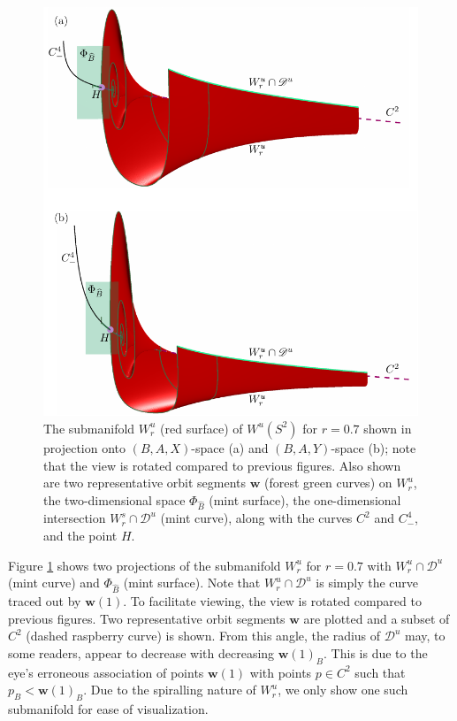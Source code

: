 \documentclass{ws-ijbc}
\begin{document}
\begin{figure}[H]
\centering
\includegraphics[]{./figures/MKMO_8.pdf}
\caption{The submanifold $W^u_{r}$ (red surface) of $W^u(S^2)$ for $r=0.7$ shown in projection onto $(B,A,X)$-space (a) and $(B,A,Y)$-space (b); note that the view is rotated compared to previous figures.  Also shown are two representative orbit segments $\mathbf{w}$ (forest green curves) on $W^u_{r}$, the two-dimensional space $\Phi_{\widehat{B}}$ (mint surface), the one-dimensional intersection $W^s_{r}\cap\mathscr{D}^u$ (mint curve), along with the curves $C^2$ and $C^4_-$, and the point $H$.}
\label{figure_8}
\end{figure}

Figure \ref{figure_8} shows two projections of the submanifold $W^u_{r}$ for $r=0.7$ with $W^u_{r} \cap \mathscr{D}^u$ (mint curve) and $\Phi_{\widehat{B}}$ (mint surface).  Note that $W^u_{r}\cap\mathscr{D}^u$ is simply the curve traced out by $\mathbf{w}(1)$.  To facilitate viewing, the view is rotated compared to previous figures.  Two representative orbit segments $\mathbf{w}$ are plotted and a subset of $C^2$ (dashed raspberry curve) is shown.  From this angle, the radius of $\mathscr{D}^u$ may, to some readers, appear to decrease with decreasing $\mathbf{w}(1)_B$.  This is due to the eye's erroneous association of points $\mathbf{w}(1)$ with points $p \in C^2$ such that $p_B < \mathbf{w}(1)_B$.  Due to the spiralling nature of $W^u_r$, we only show one such submanifold for ease of visualization.
\end{document}
